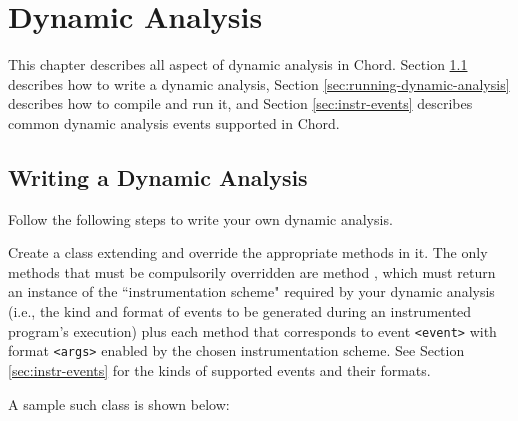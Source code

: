 \chapter{Dynamic Analysis}
\label{chap:dynamic-analysis}

This chapter describes all aspect of dynamic analysis in Chord.
Section \ref{sec:writing-dynamic-analysis} describes how to write a dynamic analysis,
Section \ref{sec:running-dynamic-analysis} describes how to compile and run it,
and Section \ref{sec:instr-events} describes common dynamic analysis events
supported in Chord.

\section{Writing a Dynamic Analysis}
\label{sec:writing-dynamic-analysis}

Follow the following steps to write your own dynamic analysis.

Create a class extending  and override
the appropriate methods in it.
The only methods that must be compulsorily overridden are method ,
which must return an instance of the ``instrumentation scheme" required by
your dynamic analysis (i.e., the kind and format of events to be generated during an
instrumented program's execution)
plus each  method that corresponds to event {\tt <event>}
with format {\tt <args>} enabled by the chosen instrumentation scheme.
See Section \ref{sec:instr-events} for the kinds of supported events and their formats.

A sample such class  is shown below:

\texonly{\newpage}

